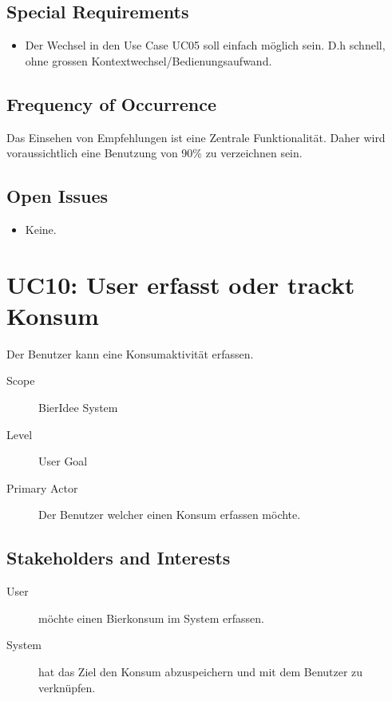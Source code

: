 \documentclass[10pt,a4paper]{scrartcl}
\begin{document}
\subsection*{Special Requirements}

\begin{itemize}
\item Der Wechsel in den Use Case UC05 soll einfach möglich sein. D.h schnell, ohne grossen Kontextwechsel/Bedienungsaufwand.
\end{itemize}



\subsection*{Frequency of Occurrence}

Das Einsehen von Empfehlungen ist eine Zentrale Funktionalität. Daher wird voraussichtlich  eine Benutzung von 90\% zu verzeichnen sein.

\subsection*{Open Issues}

\begin{itemize}
\item Keine.
\end{itemize}


\section*{UC10: User erfasst oder trackt Konsum}
Der Benutzer kann eine Konsumaktivität erfassen.

\begin{description}
\item[Scope] BierIdee System
\item[Level] User Goal
\item[Primary Actor] Der Benutzer welcher einen Konsum erfassen möchte.
\end{description}


\subsection*{Stakeholders and Interests}

\begin{description}
\item[User] möchte einen Bierkonsum im System erfassen.
\item[System] hat das Ziel den Konsum abzuspeichern und mit dem Benutzer zu verknüpfen.
\end{description}
\end{document}
